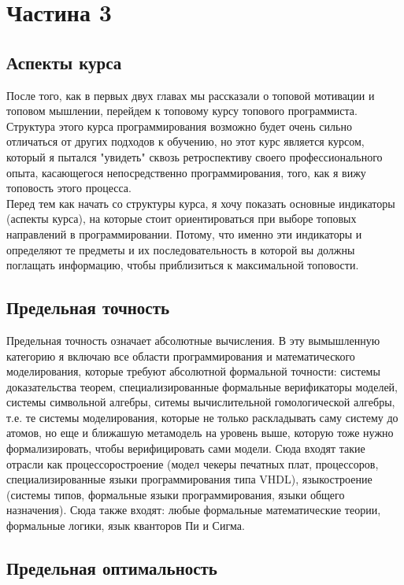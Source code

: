 \section{Частина 3}

\subsection{Аспекты курса}

После того, как в первых двух главах мы рассказали о топовой мотивации и топовом мышлении, перейдем к топовому курсу топового программиста. Структура этого курса программирования возможно будет очень сильно отличаться от других подходов к обучению, но этот курс является курсом, который я пытался "увидеть" сквозь ретроспективу своего профессионального опыта, касающегося непосредственно программирования, того, как я вижу топовость этого процесса.
\\
Перед тем как начать со структуры курса, я хочу показать основные индикаторы (аспекты курса), на которые стоит ориентироваться при выборе топовых направлений в программировании. Потому, что именно эти индикаторы и определяют те предметы и их последовательность в которой вы должны поглащать информацию, чтобы приблизиться к максимальной топовости.

\subsection{Предельная точность}

Предельная точность означает абсолютные вычисления. В эту вымышленную категорию я включаю все области программирования и математического моделирования, которые требуют абсолютной формальной точности: системы доказательства теорем, специализированные формальные верификаторы моделей, системы символьной алгебры, ситемы вычислительной гомологической алгебры, т.е. те системы моделирования, которые не только раскладывать саму систему до атомов, но еще и ближашую метамодель на уровень выше, которую тоже нужно формализировать, чтобы верифицировать сами модели. Сюда входят такие отрасли как процессоростроение (модел чекеры печатных плат, процессоров, специализированные языки программирования типа VHDL), языкостроение (системы типов, формальные языки программирования, языки общего назначения). Сюда также входят: любые формальные математические теории, формальные логики, язык кванторов Пи и Сигма.

\subsection{Предельная оптимальность}

